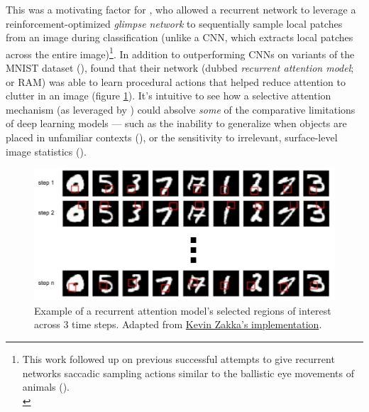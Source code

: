 \documentclass[12pt]{article}
\let\oldcite=\cite
\let\oldtextcite=\textcite
\renewcommand{\cite}[1]{\textcolor[rgb]{0, .121, .388}{\oldcite{#1}}}
\renewcommand{\textcite}[1]{\textcolor[rgb]{0, .121, .388}{\oldtextcite{#1}}}
\begin{document}
This was a motivating factor for \textcite{mnih2014recurrent}, who allowed a recurrent network to leverage a reinforcement-optimized \emph{glimpse network} to sequentially sample local patches from an image during classification (unlike a CNN, which extracts local patches across the entire image)\footnote{This work followed up on previous successful attempts to give recurrent networks saccadic sampling actions similar to the ballistic eye movements of animals (\cite{schmidhuber1991learning,stollenga2014deep}). \\}. In addition to outperforming CNNs on variants of the MNIST dataset (\cite{lecun2010mnist}), \textcite{mnih2014recurrent} found that their network (dubbed \emph{recurrent attention model}; or RAM) was able to learn procedural actions that helped reduce attention to clutter in an image (figure \ref{fig:RAM}). It's intuitive to see how a selective attention mechanism (as leveraged by \cite{mnih2014recurrent}) could absolve \emph{some} of the comparative limitations of deep learning models --- such as the inability to generalize when objects are placed in unfamiliar contexts (\cite{rosenfeld2018elephant}), or the sensitivity to irrelevant, surface-level image statistics (\cite{jo2017measuring}). 

\begin{figure}[!h]
    \centering
    \includegraphics[scale=.4]{figures/RAM.png}
    \caption{Example of a recurrent attention model's selected regions of interest across 3 time steps. Adapted from \href{https://github.com/kevinzakka/recurrent-visual-attention}{Kevin Zakka's implementation}.}
    \label{fig:RAM}
\end{figure} 
\end{document}
